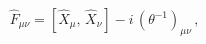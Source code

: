 \begin{equation}
\hat{F}_{\mu\nu} = \left[ \hat{X}_{\mu},\,\hat{X}_{\nu}\right]-i\,(\theta^{-1})
_{\mu\nu}\,,\label{eq:3.7}
\end{equation}

